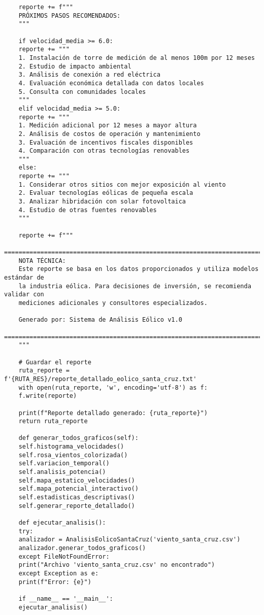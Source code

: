 \begin{lstlisting}
	reporte += f"""
	PRÓXIMOS PASOS RECOMENDADOS:
	"""
	
	if velocidad_media >= 6.0:
	reporte += """
	1. Instalación de torre de medición de al menos 100m por 12 meses
	2. Estudio de impacto ambiental
	3. Análisis de conexión a red eléctrica
	4. Evaluación económica detallada con datos locales
	5. Consulta con comunidades locales
	"""
	elif velocidad_media >= 5.0:
	reporte += """
	1. Medición adicional por 12 meses a mayor altura
	2. Análisis de costos de operación y mantenimiento
	3. Evaluación de incentivos fiscales disponibles
	4. Comparación con otras tecnologías renovables
	"""
	else:
	reporte += """
	1. Considerar otros sitios con mejor exposición al viento
	2. Evaluar tecnologías eólicas de pequeña escala
	3. Analizar hibridación con solar fotovoltaica
	4. Estudio de otras fuentes renovables
	"""
	
	reporte += f"""
	==================================================================================
	NOTA TÉCNICA:
	Este reporte se basa en los datos proporcionados y utiliza modelos estándar de
	la industria eólica. Para decisiones de inversión, se recomienda validar con
	mediciones adicionales y consultores especializados.
	
	Generado por: Sistema de Análisis Eólico v1.0
	==================================================================================
	"""
	
	# Guardar el reporte
	ruta_reporte = f'{RUTA_RES}/reporte_detallado_eolico_santa_cruz.txt'
	with open(ruta_reporte, 'w', encoding='utf-8') as f:
	f.write(reporte)
	
	print(f"Reporte detallado generado: {ruta_reporte}")
	return ruta_reporte
	
	def generar_todos_graficos(self):
	self.histograma_velocidades()
	self.rosa_vientos_colorizada()
	self.variacion_temporal()
	self.analisis_potencia()
	self.mapa_estatico_velocidades()
	self.mapa_potencial_interactivo()
	self.estadisticas_descriptivas()
	self.generar_reporte_detallado()
	
	def ejecutar_analisis():
	try:
	analizador = AnalisisEolicoSantaCruz('viento_santa_cruz.csv')
	analizador.generar_todos_graficos()
	except FileNotFoundError:
	print("Archivo 'viento_santa_cruz.csv' no encontrado")
	except Exception as e:
	print(f"Error: {e}")
	
	if __name__ == '__main__':
	ejecutar_analisis()
	
	
\end{lstlisting}